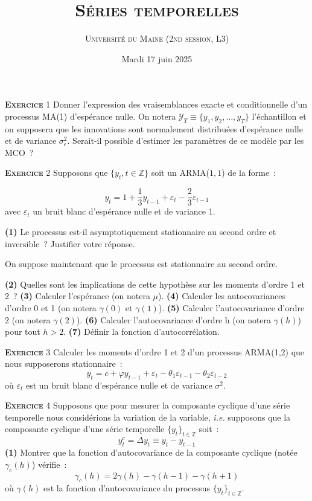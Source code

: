 \documentclass[10pt,a4paper,notitlepage,twocolumn]{article}
\newcommand{\exercice}[1]{\textsc{\textbf{Exercice}} #1}
\newcommand{\question}[1]{\textbf{(#1)}}
\begin{document}
\title{\textsc{Séries temporelles}}
\author{\textsc{Université du Maine (2nd session, L3)}}
\date{Mardi 17 juin 2025}


\maketitle


\exercice{1} Donner l'expression des vraisemblances exacte et
conditionnelle d'un processus MA(1) d'espérance nulle. On notera
$\mathcal Y_T \equiv \{y_1,y_2,\dots,y_T\}$ l'échantillon et on
supposera que les innovations sont normalement distribuées d'espérance
nulle et de variance $\sigma_{\epsilon}^2$. Serait-il possible
d'estimer les paramètres de ce modèle par les MCO~?

\bigskip
\bigskip

\exercice{2} Supposons que $\{y_t,t\in\mathbb Z\}$ soit un ARMA($1,1$) de la forme~:

\[
y_t = 1 + \frac{1}{3}y_{t-1} + \varepsilon_t - \frac{2}{3} \varepsilon_{t-1}
\]
avec $\varepsilon_t$ un bruit blanc d'espérance nulle et de variance 1.\newline

\question{1}   Le    processus   est-il   asymptotiquement
stationnaire  au   second  ordre   et  inversible~?   Justifier  votre
réponse.\newline

On suppose maintenant que le processus est stationnaire au second
ordre.\newline

\question{2} Quelles sont les implications de cette hypothèse sur les
moments d'ordre 1 et 2~? \question{3} Calculer l'espérance (on notera
$\mu$). \question{4} Calculer les autocovariances d'ordre
0 et 1 (on notera $\gamma(0)$ et $\gamma(1)$). \question{5} Calculer
l'autocovariance d'ordre 2 (on notera $\gamma(2)$). \question{6}
Calculer l'autocovariance d'ordre h (on notera $\gamma(h)$) pour tout
$h>2$.  \question{7} Définir la fonction d'autocorrélation.

\bigskip
\bigskip

\exercice{3} Calculer les moments d'ordre 1 et 2 d'un processus ARMA(1,2) que nous supposerons stationnaire~:
\[
y_t = c + \varphi y_{t-1} + \varepsilon_t - \theta_1 \varepsilon_{t-1} - \theta_2 \varepsilon_{t-2}
\]
où $\varepsilon_t$ est un bruit blanc d'espérance nulle et de variance $\sigma^2$.

\exercice{4} Supposons que pour mesurer la composante cyclique d'une
série temporelle nous considérions la variation de la variable,
\emph{i.e.} supposons que la composante cyclique d'une série temporelle $\{y_t\}_{t\in\mathbb Z}$ soit~:
\[
y^c_t = \Delta y_t \equiv y_t-y_{t-1}
\]
\question{1} Montrer que la fonction d'autocovariance de la composante cyclique (notée $\gamma_c(h)$) vérifie~:
\[
\gamma_c(h) = 2\gamma(h)-\gamma(h-1)-\gamma(h+1)
\]
où $\gamma(h)$ est la fonction d'autocovariance du processus
$\{y_t\}_{t\in\mathbb Z}$.\newline
\end{document}
